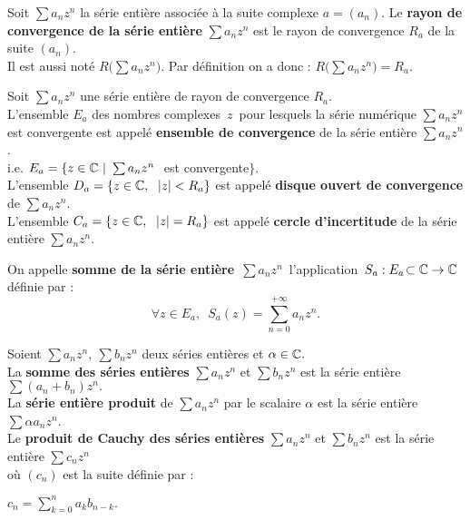 \vspace{1.2cm}

Soit \(\sum a_nz^n\) la série entière associée à la suite complexe \(a=(a_n)\). Le \textbf{rayon de convergence de la série entière} \(\sum a_n z^n\) est le rayon de convergence \(R_a\) de la suite \((a_n)\)\vspace{0.1cm}.\\
Il est aussi noté \(R\bigl(\sum a_nz^n\bigr)\). Par définition on a donc : \(R\bigl(\sum a_nz^n\bigr)=R_a.\)

\vspace{1.5cm}

Soit \(\sum a_nz^n\) une série entière de rayon de convergence \(R_a\).\\
L'ensemble \(E_a\) des nombres complexes \(\,z\,\) pour lesquels la série numérique \(\sum a_nz^n\) est convergente est appelé \textbf{ensemble de convergence} de la série entière \(\sum a_nz^n\).\vspace{0.1cm}\\
i.e. \(E_a =\{ z\in \CC \ | \ \sum a_nz^n\ \) est convergente$\}$.\vspace{0.2cm}\\
L'ensemble \(D_a = \{ z\in \mathbb{C}, \ \; |z|<R_a \} \) est appelé \textbf{disque ouvert de convergence} de  \(\sum a_nz^n\).\vspace{0.2cm}\\
L'ensemble \(C_a=\{ z\in \mathbb{C}, \ \; |z|=R_a \} \) est appelé \textbf{cercle d'incertitude} de la série entière \(\sum a_nz^n\).

\newpage

On appelle \textbf{somme de la série entière} \(\,\sum a_n z^n\,\) l'application \(\,S_a:E_a\!\subset \mathbb{C} \to \mathbb{C}\,\) définie par :\vspace{-0.2cm} \[\forall z\in E_a,\ \; S_a(z)=\sum_{n=0}^{+\infty}a_nz^n.\]

\vspace{1cm}

Soient \(\sum a_nz^n,\ \sum b_nz^n\) deux séries entières et \(\alpha \in \mathbb{C}.\)\vspace{0.2cm}\\
La \textbf{somme des séries entières}  \(\sum a_nz^n\) et \(\sum b_nz^n\) est la série entière \(\sum(a_n+b_n)z^n. \)\vspace{0.2cm}\\
La \textbf{série entière produit} de \(\sum a_nz^n\) par le scalaire \(\alpha\) est la série entière \(\sum \alpha a_nz^n\).\vspace{0.2cm}\\
Le \textbf{produit de Cauchy des séries entières} \(\sum a_n z^n\) et \(\sum b_nz^n\) est la série entière \(\sum c_n z^n\) \\
où \((c_n)\) est la suite définie par : \begin{small}\(\displaystyle c_n = \sum_{k=0}^{n}a_kb_{n-k}.\)\end{small}

